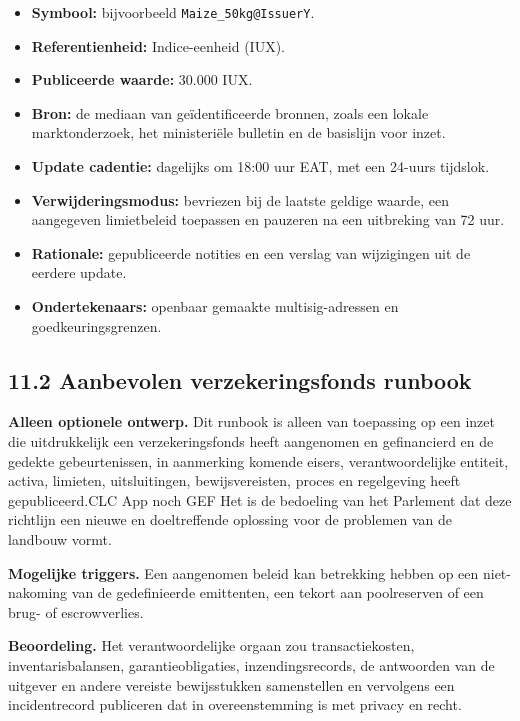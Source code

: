 \documentclass[11pt]{article}
\begin{document}
\begin{itemize}[leftmargin=*]
\item \textbf{Symbool:} bijvoorbeeld \texttt{Maize\_50kg@IssuerY}.
\item \textbf{Referentienheid:} Indice-eenheid (IUX).
\item \textbf{Publiceerde waarde:} 30.000 IUX.
\item \textbf{Bron:} de mediaan van geïdentificeerde bronnen, zoals een lokale marktonderzoek, het ministeriële bulletin en de basislijn voor inzet.
\item \textbf{Update cadentie:} dagelijks om 18:00 uur EAT, met een 24-uurs tijdslok.
\item \textbf{Verwijderingsmodus:} bevriezen bij de laatste geldige waarde, een aangegeven limietbeleid toepassen en pauzeren na een uitbreking van 72 uur.
\item \textbf{Rationale:} gepubliceerde notities en een verslag van wijzigingen uit de eerdere update.
\item \textbf{Ondertekenaars:} openbaar gemaakte multisig-adressen en goedkeuringsgrenzen.
\end{itemize}
\subsection*{11.2 Aanbevolen verzekeringsfonds runbook}

\textbf{Alleen optionele ontwerp.} Dit runbook is alleen van toepassing op een inzet die uitdrukkelijk een verzekeringsfonds heeft aangenomen en gefinancierd en de gedekte gebeurtenissen, in aanmerking komende eisers, verantwoordelijke entiteit, activa, limieten, uitsluitingen, bewijsvereisten, proces en regelgeving heeft gepubliceerd.CLC App noch GEF Het is de bedoeling van het Parlement dat deze richtlijn een nieuwe en doeltreffende oplossing voor de problemen van de landbouw vormt.

\textbf{Mogelijke triggers.} Een aangenomen beleid kan betrekking hebben op een niet-nakoming van de gedefinieerde emittenten, een tekort aan poolreserven of een brug- of escrowverlies.

\textbf{Beoordeling.} Het verantwoordelijke orgaan zou transactiekosten, inventarisbalansen, garantieobligaties, inzendingsrecords, de antwoorden van de uitgever en andere vereiste bewijsstukken samenstellen en vervolgens een incidentrecord publiceren dat in overeenstemming is met privacy en recht.
\end{document}
